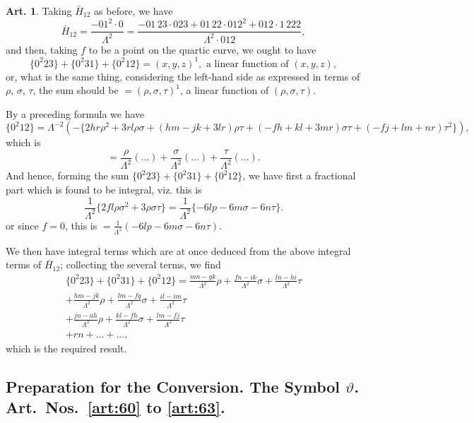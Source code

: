 \documentclass[12pt,a4paper]{article}
\theoremstyle{definition}
\newtheorem{art}{Art.}[section]
\begin{document}
\begin{art}\label{art:59}
Taking $\bar{H}_{12}$ as before, we have
\[
\bar{H}_{12} = \frac{-01^2 \cdot 0}{\Lambda^2} = \frac{-01\,23 \cdot 023 + 01\,22 \cdot 012^2 + 012 \cdot 1\,222}{\Lambda^2 \cdot 012},
\]
and then, taking $f$ to be a point on the quartic curve, we ought to have
\[
\{0^2 23\} + \{0^2 31\} + \{0^2 12\} = (x, y, z)^1, \text{ a linear function of } (x, y, z),
\]
or, what is the same thing, considering the left-hand side as expressed in terms of $\rho$, $\sigma$, $\tau$, the sum should be $= (\rho, \sigma, \tau)^1$, a linear function of $(\rho, \sigma, \tau)$.

By a preceding formula we have
\[
\{0^2 12\} = \Lambda^{-2}(-\{2hr\rho^2 + 3rl\rho\sigma + (hm - jk + 3lr)\rho\tau + (-fh + kl + 3mr)\sigma\tau + (-fj + lm + nr)\tau^2\}),
\]
which is
\[
= \frac{\rho}{\Lambda^2}(\ldots) + \frac{\sigma}{\Lambda^2}(\ldots) + \frac{\tau}{\Lambda^2}(\ldots).
\]
And hence, forming the sum $\{0^2 23\} + \{0^2 31\} + \{0^2 12\}$, we have first a fractional part which is found to be integral, viz. this is
\[
\frac{1}{\Lambda^2}\{2fl\rho\sigma^2 + 3\rho\sigma\tau\} = \frac{1}{\Lambda^2}\{-6lp - 6m\sigma - 6n\tau\}.
\]
or since $f = 0$, this is $= \frac{1}{\Lambda^2}(-6lp - 6m\sigma - 6n\tau)$.

We then have integral terms which are at once deduced from the above integral terms of $\bar{H}_{12}$; collecting the several terms, we find
\begin{multline*}
\{0^2 23\} + \{0^2 31\} + \{0^2 12\} = \frac{mn - gk}{\Lambda^2}\rho + \frac{fn - ik}{\Lambda^2}\sigma + \frac{ln - hi}{\Lambda^2}\tau \\
+ \frac{hm - jk}{\Lambda^2}\rho + \frac{lm - fq}{\Lambda^2}\sigma + \frac{il - im}{\Lambda^2}\tau \\
+ \frac{jn - ah}{\Lambda^2}\rho + \frac{kl - fh}{\Lambda^2}\sigma + \frac{lm - fj}{\Lambda^2}\tau \\
+ rn + \ldots + \ldots,
\end{multline*}
which is the required result.
\end{art}

\newpage
\subsection*{Preparation for the Conversion. The Symbol $\vartheta$. Art.~Nos.~\ref{art:60} to \ref{art:63}.}
\end{document}
